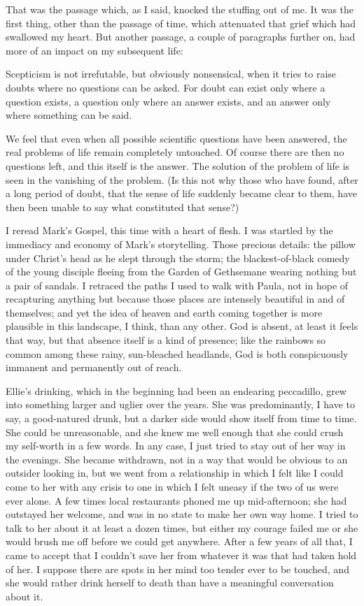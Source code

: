 That was the passage which, as I said, knocked the stuffing out of me. It was the first thing, other than the passage of time, which attenuated that grief which had swallowed my heart. But another passage, a couple of paragraphs further on, had more of an impact on my subsequent life:

\begin{quoting}
    Scepticism is not irrefutable, but obviously nonsensical, when it tries to raise doubts where no questions can be asked. For doubt can exist only where a question exists, a question only where an answer exists, and an answer only where something can be said.

    We feel that even when all possible scientific questions have been answered, the real problems of life remain completely untouched. Of course there are then no questions left, and this itself is the answer. The solution of the problem of life is seen in the vanishing of the problem. (Is this not why those who have found, after a long period of doubt, that the sense of life suddenly became clear to them, have then been unable to say what constituted that sense?)
\end{quoting}

I reread Mark's Gospel, this time with a heart of flesh. I was startled by the immediacy and economy of Mark's storytelling. Those precious details: the pillow under Christ's head as he slept through the storm; the blackest-of-black comedy of the young disciple fleeing from the Garden of Gethsemane wearing nothing but a pair of sandals. I retraced the paths I used to walk with Paula, not in hope of recapturing anything but because those places are intensely beautiful in and of themselves; and yet the idea of heaven and earth coming together is more plausible in this landscape, I think, than any other. God is absent, at least it feels that way, but that absence itself is a kind of presence; like the rainbows so common among these rainy, sun-bleached headlands, God is both conspicuously immanent and permanently out of reach.

Ellie's drinking, which in the beginning had been an endearing peccadillo, grew into something larger and uglier over the years. She was predominantly, I have to say, a good-natured drunk, but a darker side would show itself from time to time. She could be unreasonable, and she knew me well enough that she could crush my self-worth in a few words. In any case, I just tried to stay out of her way in the evenings. She became withdrawn, not in a way that would be obvious to an outsider looking in, but we went from a relationship in which I felt like I could come to her with any crisis to one in which I felt uneasy if the two of us were ever alone. A few times local restaurants phoned me up mid-afternoon; she had outstayed her welcome, and was in no state to make her own way home. I tried to talk to her about it at least a dozen times, but either my courage failed me or she would brush me off before we could get anywhere. After a few years of all that, I came to accept that I couldn't save her from whatever it was that had taken hold of her. I suppose there are spots in her mind too tender ever to be touched, and she would rather drink herself to death than have a meaningful conversation about it.

